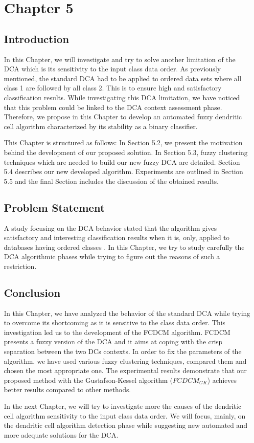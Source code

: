 \chapter{Chapter 5}
\section{Introduction}
In this Chapter, we will investigate and try to solve another limitation of the DCA which is its sensitivity to the input class data order.  As previously mentioned, the standard DCA had to be applied to ordered data sets where all class 1 are followed by all class 2. This is to ensure high and satisfactory classification results.  While investigating this DCA limitation, we have noticed that this problem could be linked to the DCA context assessment phase. Therefore, we propose in this Chapter to develop an automated fuzzy dendritic cell algorithm characterized by its stability as a binary classifier.  

This Chapter is structured as follows: In Section 5.2, we present the motivation behind the development of our proposed solution. In Section 5.3, fuzzy clustering techniques which are needed to build our new fuzzy DCA  are detailed. Section 5.4  describes our new developed   algorithm. Experiments are outlined in Section 5.5 and the final Section includes the discussion of the obtained results.
\section{Problem Statement}
A study focusing on the DCA behavior stated that the algorithm gives satisfactory and interesting  classification results when it is, only, applied to databases having ordered  classes \cite{dDCA}. In this Chapter, we try to study carefully  the DCA algorithmic phases while trying to figure out the reasons of such a restriction.

\section{Conclusion}
In this Chapter, we have analyzed the behavior of the standard DCA while trying to overcome its shortcoming as it is sensitive to the class data order.  This investigation led us to the development of the  FCDCM algorithm. FCDCM   presents a fuzzy version of the DCA and it aims at coping with the crisp separation between the two DCs contexts. In order to fix the parameters of the algorithm, we have used various fuzzy clustering techniques, compared them and chosen the most appropriate one. The experimental results demonstrate that our proposed method with the Gustafson-Kessel algorithm ($FCDCM_{GK}$) achieves better results   compared to other methods. 

In the next Chapter, we will try to investigate more the causes of the dendritic cell algorithm sensitivity to the input class data order. We will focus, mainly, on the dendritic cell algorithm detection phase   while suggesting new automated and more adequate solutions for the DCA.




